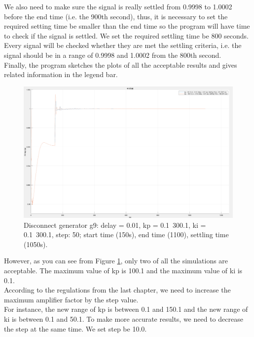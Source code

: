 \documentclass{report}
\begin{document}
We also need to make sure the signal is really settled from 0.9998 to 1.0002 before the end time (i.e. the 900th second), thus, it is necessary to set the required setting time be smaller than the end time so the program will have time to check if the signal is settled. We set the required settling time be 800 seconds. \\

Every signal will be checked whether they are met the settling criteria, i.e. the signal should be in a range of 0.9998 and 1.0002 from the 800th second.\\

Finally, the program sketches the plots of all the acceptable results and gives related information in the legend bar. \\

\begin{figure}[htbp]
\centering
\includegraphics[width = .819\textwidth]{figure/4_1_2_a.png}
\caption{Disconnect generator g9: delay = 0.01, kp = 0.1~300.1, ki = 0.1~300.1, step: 50; start time (150s), end time (1100), settling time (1050s).}
\label{4_1_2_a}
\end{figure}

However, as you can see from Figure \textcolor{red}{\ref{4_1_2_a}}, only two of all the simulations are acceptable. The maximum value of kp is 100.1 and the maximum value of ki is 0.1. \\

According to the regulations from the last chapter, we need to increase the maximum amplifier factor by the step value. \\

For instance, the new range of kp is between 0.1 and 150.1 and the new range of ki is between 0.1 and 50.1. To make more accurate results, we need to decrease the step at the same time. We set step be 10.0. \\
\end{document}
